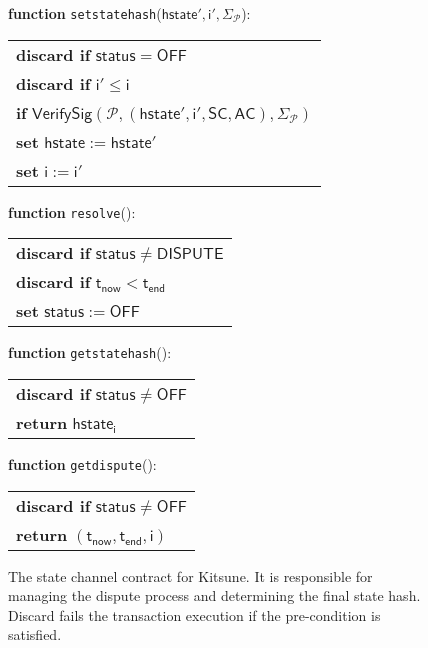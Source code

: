 \documentclass{llncs}
\newcommand{\chanstatus}{\mathsf{status}}
\newcommand{\chandispute}{\mathsf{DISPUTE}}
\newcommand{\chanoff}{\mathsf{OFF}}
\newcommand{\hstate}{\mathsf{hstate}}
\newcommand{\hstatei}{\mathsf{hstate}_{\monotoniccounter}}
\newcommand{\monotoniccounter}{\mathsf{i}}
\newcommand{\participant}{\mathcal{P}}
\newcommand{\statechannel}{\mathsf{SC}}
\newcommand{\verifysig}{\mathsf{VerifySig}}
\newcommand{\appcontract}{\mathsf{AC}}
\newcommand{\timenow}{\mathsf{t}_{\mathsf{now}}}
\newcommand{\timeend}{\mathsf{t}_{\mathsf{end}}}
\newcommand{\oninput}{\textcolor{entry}{\bf function }}
\newcommand{\stringlitt}[1]{\texttt{\textcolor{string}{#1}}}
\begin{document}
\begin{figure}[h]
\begin{boxedminipage}{\columnwidth}
			
			\begin{flushleft}
				\oninput  \stringlitt{setstatehash}($\hstate', \monotoniccounter', \Sigma_{\participant}$):
			\end{flushleft}
			\begin{tabular}{l}
				\quad \textbf{discard if} $\chanstatus = \chanoff$ \\
				\quad \textbf{discard if} $\monotoniccounter' \leq \monotoniccounter$ \\
				\quad \textbf{if} $\verifysig(\participant, (\hstate', \monotoniccounter', \statechannel, \appcontract), \Sigma_{\participant})$ \\
				\quad \quad \textbf{set} $\hstate := \hstate'$ \\
				\quad \quad \textbf{set} $\monotoniccounter := \monotoniccounter'$ \\
			\end{tabular}
			
			\begin{flushleft} 
				\oninput \stringlitt{resolve}(): 
			\end{flushleft}
			\begin{tabular}{l}
				\quad \textbf{discard if} $\chanstatus \neq \chandispute$ \\
				\quad \textbf{discard if} $\timenow < \timeend$ \\
				\quad \textbf{set} $\chanstatus := \chanoff$ 
			\end{tabular}
			
			\begin{flushleft} 
				\oninput \stringlitt{getstatehash}(): 
			\end{flushleft}
			\begin{tabular}{l}
				\quad \textbf{discard if} $\chanstatus \neq \chanoff$ \\
				\quad \textbf{return} $\hstatei$
			\end{tabular}
			
			\begin{flushleft} 
				\oninput \stringlitt{getdispute}(): 
			\end{flushleft}
			\begin{tabular}{l}
				\quad \textbf{discard if} $\chanstatus \neq \chanoff$ \\
				\quad \textbf{return} $(\timenow, \timeend, \monotoniccounter)$
			\end{tabular}
		\end{boxedminipage}
		\caption{The state channel contract for \textsf{Kitsune}. It is responsible for managing the dispute process and determining the final state hash.  Discard fails the transaction execution if the pre-condition is satisfied.} \label{fig:statechannel}
	\end{figure}
\end{document}

